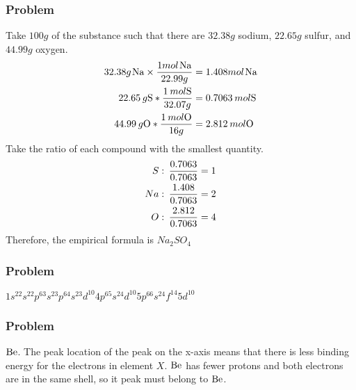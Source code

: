 \documentclass[../main.tex]{subfiles}
\begin{document}
\subsubsection*{Problem \countThis}
Take \(100g\) of the substance such that there are \(32.38g\) sodium, \(22.65g\) sulfur, and \(44.99g\) oxygen. 
\begin{equation}
\begin{aligned}
    32.38g\hspace{0.1em}\ce{Na} \times \frac{1mol\hspace{0.1em}\ce{Na}}{22.99g} &= 1.408mol\hspace{0.1em}\ce{Na} \\
    22.65\hspace{0.2em}g \ce{S} * \frac{1\hspace{0.2em}mol\ce{S}}{32.07g} &= 0.7063 \hspace{0.2em}mol\ce{S}\\
    44.99\hspace{0.2em}g\ce{O} * \frac{1\hspace{0.2em}mol\ce{O}}{16 g} &= 2.812\hspace{0.2em}mol \ce{O}
\end{aligned}
\end{equation}
Take the ratio of each compound with the smallest quantity. 
\begin{equation}
\begin{split}
    S:\hspace{0.2em}\frac{0.7063}{0.7063} = 1 \\
    Na:\hspace{0.2em}\frac{1.408}{0.7063} = 2 \\
    O:\hspace{0.2em}\frac{2.812}{0.7063} = 4
\end{split}
\end{equation}
Therefore, the empirical formula is \(Na_{2}SO_{4}\)
\subsubsection*{Problem \countThis}
\(1s^22s^22p^63s^23p^64s^23d^{10}4p^65s^24d^{10}5p^66s^24f^{14}5d^{10}\)
\subsubsection*{Problem \countThis}
\(\ce{Be}\). The peak location of the peak on the x-axis means that there is less binding energy for the electrons in element \(X\). \(\ce{Be}\) has fewer protons
and both electrons are in the same shell, so it peak must belong to \(\ce{Be}\).
\end{document}
